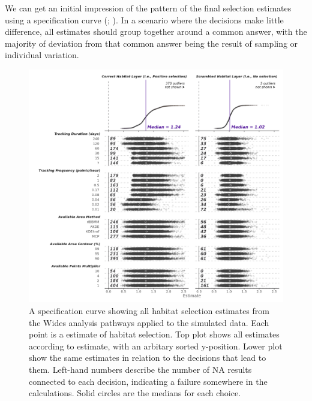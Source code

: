 \documentclass[10pt,a4paper]{article}
\begin{document}
We can get an initial impression of the pattern of the final selection estimates using a specification curve (; ).
In a scenario where the decisions make little difference, all estimates should group together around a common answer, with the majority of deviation from that common answer being the result of sampling or individual variation.

\begin{figure}
\includegraphics[width=1\linewidth]{../figures/widesSpecCurve} \caption{A specification curve showing all habitat selection estimates from the Wides analysis pathways applied to the simulated data. Each point is a estimate of habitat selection. Top plot shows all estimates according to estimate, with an arbitary sorted y-position. Lower plot show the same estimates in relation to the decisions that lead to them. Left-hand numbers describe the number of NA results connected to each decision, indicating a failure somewhere in the calculations. Solid circles are the medians for each choice.}\label{fig:specCurveWides}
\end{figure}
\end{document}
